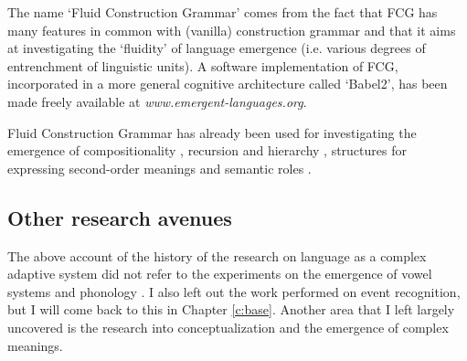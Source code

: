 The name `Fluid Construction Grammar' comes from the fact that FCG has many features in common with (vanilla) construction grammar \citep{croft05logical} and that it aims at investigating the `fluidity' of language emergence (i.e. various degrees of entrenchment of linguistic units). A software implementation of FCG, incorporated in a more general cognitive architecture called `Babel2', has been made freely available at {\em www.emergent-languages.org}.

Fluid Construction Grammar has already been used for investigating the emergence of compositionality \citep{debeule06emergence}, recursion and hierarchy \citep{bleys08recursive, debeule07compositionality, debeule08emergence}, structures for expressing second-order meanings \citep{steels05planning} and semantic roles \citep{steels04constructivist, vantrijp08emergence}.

\subsection{Other research avenues}
\label{s:other}

The above account of the history of the research on language as a complex adaptive system did not refer to the experiments on the emergence of vowel systems and phonology \citep{deboer00self, oudeyer05self-organization}. I also left out the work performed on event recognition, but I will come back to this in Chapter \ref{c:base}. Another area that I left largely uncovered is the research into conceptualization and the emergence of complex meanings.

